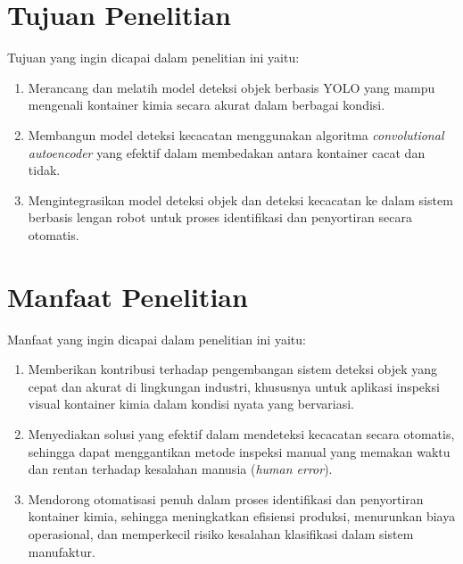 \section{Tujuan Penelitian}
Tujuan yang ingin dicapai dalam penelitian ini yaitu:
\begin{enumerate}
  \item Merancang dan melatih model deteksi objek berbasis YOLO yang
    mampu mengenali kontainer kimia secara akurat dalam berbagai kondisi.
  \item Membangun model deteksi kecacatan menggunakan algoritma
    \textit{convolutional autoencoder} yang efektif dalam membedakan antara
    kontainer cacat dan tidak.
  \item Mengintegrasikan model deteksi objek dan deteksi kecacatan ke
    dalam sistem berbasis lengan robot untuk proses identifikasi dan
    penyortiran secara otomatis.
\end{enumerate}

\vspace{1em}

\section{Manfaat Penelitian}
Manfaat yang ingin dicapai dalam penelitian ini yaitu:
\begin{enumerate}
  \item Memberikan kontribusi terhadap pengembangan sistem deteksi
    objek yang cepat dan akurat di lingkungan industri, khususnya
    untuk aplikasi inspeksi visual kontainer kimia dalam kondisi
    nyata yang bervariasi.
  \item Menyediakan solusi yang efektif dalam mendeteksi kecacatan secara
    otomatis, sehingga dapat menggantikan metode inspeksi manual yang
    memakan waktu dan rentan terhadap kesalahan manusia (\textit{human error}).
  \item Mendorong otomatisasi penuh dalam proses identifikasi dan
    penyortiran kontainer kimia, sehingga meningkatkan efisiensi
    produksi, menurunkan biaya operasional, dan memperkecil risiko
    kesalahan klasifikasi dalam sistem manufaktur.
\end{enumerate}

